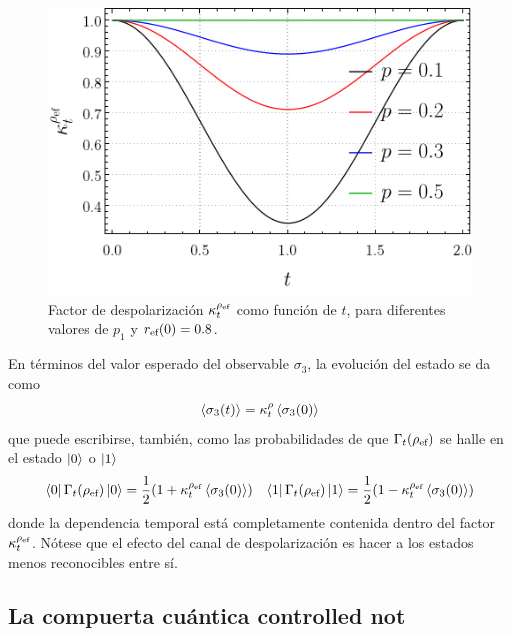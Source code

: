 \begin{figure}[ht!]
  \centering
  \includegraphics[width=0.6\linewidth]{chapter3/figures_toy/K(t).png}
  \caption{Factor de despolarización $\kappa_{t}^{\rho_{\text{ef}}}$ como función de $t$, para diferentes valores de $p_{1}$ y $r_{\text{ef}}(0)=0.8$.}
  \label{fig:SWAPFactor2Dt}
\end{figure}

En términos del valor esperado del observable $\sigma_{3}$, la evolución del estado se da como
\begin{equation}
  \expval{\sigma_{3}(t)}=\kappa_{t}^{\rho}\expval{\sigma_{3}(0)}
\end{equation}
que puede escribirse, también, como las probabilidades de que $\Gamma_{t}(\rho_{\text{ef}})$ se halle en el estado $\ket{0}$ o $\ket{1}$
 \begin{align}
  \bra{0}\Gamma_{t}(\rho_{\text{ef}})\ket{0}=\frac{1}{2}(1+\kappa_{t}^{\rho_{\text{ef}}}\expval{\sigma_{3}(0)}) && \bra{1}\Gamma_{t}(\rho_{\text{ef}})\ket{1}=\frac{1}{2}(1-\kappa_{t}^{\rho_{\text{ef}}}\expval{\sigma_{3}(0)})
 \end{align}
 donde la dependencia temporal está completamente contenida dentro del factor $\kappa_{t}^{\rho_{\text{ef}}}$. Nótese que el efecto del canal de despolarización es hacer a los estados menos reconocibles entre sí.


\subsection{La compuerta cuántica controlled not}

